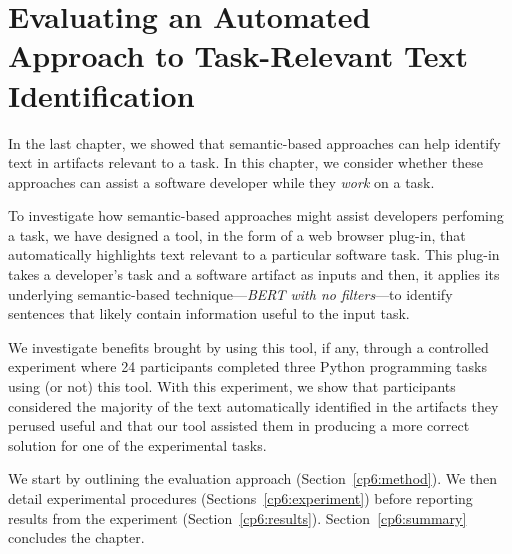 \setcounter{chapter}{5}


\chapter{Evaluating an Automated Approach to Task-Relevant Text Identification}
\label{ch:assisting}


In the last chapter, we showed that semantic-based approaches can help identify text in artifacts relevant to a task. 
In this chapter, we consider whether these approaches can assist a software developer while they \textit{work} on a task.



To investigate how semantic-based approaches might assist developers perfoming a task, we have designed a tool, in the form of a web browser plug-in, that automatically highlights 
text relevant to a particular software task.
This plug-in takes a developer's task and a software artifact as inputs and then, it applies its underlying semantic-based technique---\textit{BERT with no filters}---to identify sentences that likely contain information useful to the input task.

We investigate benefits brought by using this tool, if any, through a controlled experiment
where 24 participants completed three Python programming tasks using (or not) this tool. 
With this experiment, we show that participants considered the majority of the text automatically identified in the artifacts 
they perused useful and that 
our tool assisted them in producing a more correct solution for one of the experimental tasks.



We start by outlining the evaluation approach  (Section~\ref{cp6:method}). We then
detail experimental procedures  (Sections~\ref{cp6:experiment}) before reporting
results from the experiment 
(Section~\ref{cp6:results}).
Section~\ref{cp6:summary} concludes the chapter.





%     









